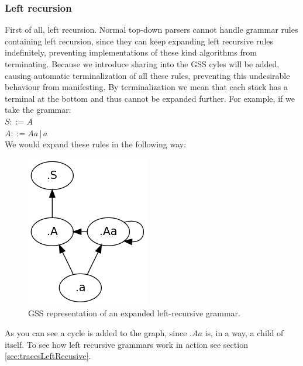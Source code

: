 \documentclass[a4paper,10pt]{article}
\begin{document}
\subsubsection{Left recursion}
First of all, left recursion. Normal top-down parsers cannot handle grammar rules containing left recursion, since they can keep expanding left recursive rules indefinitely, preventing implementations of these kind algorithms from terminating. Because we introduce sharing into the GSS cyles will be added, causing automatic terminalization of all these rules, preventing this undesirable behaviour from manifesting. By terminalization we mean that each stack has a terminal at the bottom and thus cannot be expanded further. For example, if we take the grammar:\\
$S ::= A$\\
$A ::= Aa\,|\,a$\\
We would expand these rules in the following way:
\begin{figure}[H]
\centering
\includegraphics[scale=0.5]{left-recursive.png}
\caption{GSS representation of an expanded left-recursive grammar.}
\end{figure}
As you can see a cycle is added to the graph, since $.Aa$ is, in a way, a child of itself. To see how left recursive grammars work in action see section \ref{sec:tracesLeftRecusive}.
\end{document}
